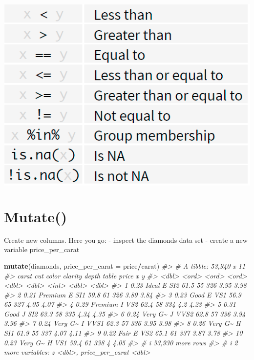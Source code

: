 \documentclass[
]{book}
\newenvironment{Shaded}{\begin{snugshade}}{\end{snugshade}}
\newcommand{\AttributeTok}[1]{\textcolor[rgb]{0.13,0.29,0.53}{#1}}
\newcommand{\CommentTok}[1]{\textcolor[rgb]{0.56,0.35,0.01}{\textit{#1}}}
\newcommand{\FunctionTok}[1]{\textcolor[rgb]{0.13,0.29,0.53}{\textbf{#1}}}
\newcommand{\NormalTok}[1]{#1}
\newcommand{\SpecialCharTok}[1]{\textcolor[rgb]{0.81,0.36,0.00}{\textbf{#1}}}
\begin{document}
\includegraphics[width=0.4\linewidth,height=0.2\textheight]{images/logical_tests}

\section*{Mutate()}\label{mutate}

Create new columns. Here you go: - inspect the diamonds data set -
create a new variable price\_per\_carat

\begin{Shaded}
\begin{Highlighting}[]
\FunctionTok{mutate}\NormalTok{(diamonds, }\AttributeTok{price\_per\_carat =}\NormalTok{ price}\SpecialCharTok{/}\NormalTok{carat)}
\CommentTok{\#\textgreater{} \# A tibble: 53,940 x 11}
\CommentTok{\#\textgreater{}    carat cut     color clarity depth table price     x     y}
\CommentTok{\#\textgreater{}    \textless{}dbl\textgreater{} \textless{}ord\textgreater{}   \textless{}ord\textgreater{} \textless{}ord\textgreater{}   \textless{}dbl\textgreater{} \textless{}dbl\textgreater{} \textless{}int\textgreater{} \textless{}dbl\textgreater{} \textless{}dbl\textgreater{}}
\CommentTok{\#\textgreater{}  1  0.23 Ideal   E     SI2      61.5    55   326  3.95  3.98}
\CommentTok{\#\textgreater{}  2  0.21 Premium E     SI1      59.8    61   326  3.89  3.84}
\CommentTok{\#\textgreater{}  3  0.23 Good    E     VS1      56.9    65   327  4.05  4.07}
\CommentTok{\#\textgreater{}  4  0.29 Premium I     VS2      62.4    58   334  4.2   4.23}
\CommentTok{\#\textgreater{}  5  0.31 Good    J     SI2      63.3    58   335  4.34  4.35}
\CommentTok{\#\textgreater{}  6  0.24 Very G\textasciitilde{} J     VVS2     62.8    57   336  3.94  3.96}
\CommentTok{\#\textgreater{}  7  0.24 Very G\textasciitilde{} I     VVS1     62.3    57   336  3.95  3.98}
\CommentTok{\#\textgreater{}  8  0.26 Very G\textasciitilde{} H     SI1      61.9    55   337  4.07  4.11}
\CommentTok{\#\textgreater{}  9  0.22 Fair    E     VS2      65.1    61   337  3.87  3.78}
\CommentTok{\#\textgreater{} 10  0.23 Very G\textasciitilde{} H     VS1      59.4    61   338  4     4.05}
\CommentTok{\#\textgreater{} \# i 53,930 more rows}
\CommentTok{\#\textgreater{} \# i 2 more variables: z \textless{}dbl\textgreater{}, price\_per\_carat \textless{}dbl\textgreater{}}
\end{Highlighting}
\end{Shaded}
\end{document}
